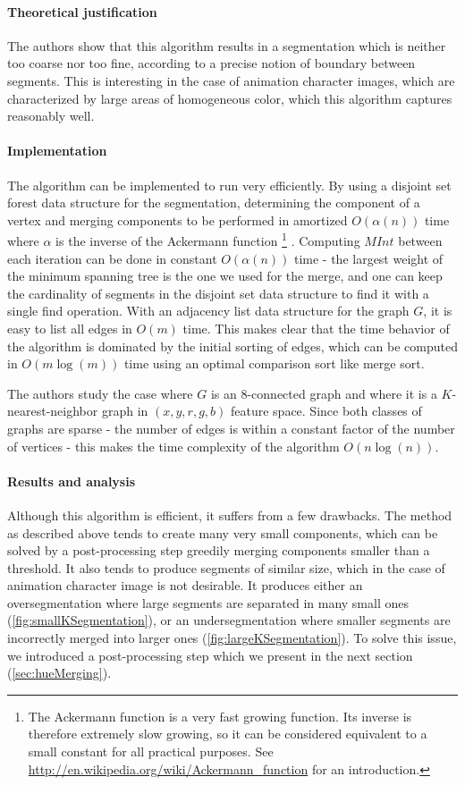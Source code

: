 \paragraph{Theoretical justification} The authors show that this algorithm results in a segmentation which is neither too coarse nor too fine, according to a precise notion of boundary between segments. This is interesting in the case of animation character images, which are characterized by large areas of homogeneous color, which this algorithm captures reasonably well.

\paragraph{Implementation} The algorithm can be implemented to run very efficiently. By using a disjoint set forest data structure for the segmentation, determining the component of a vertex and merging components to be performed in amortized $O(\alpha(n))$ time where $\alpha$ is the inverse of the Ackermann function
\footnote{
The Ackermann function is a very fast growing function. Its inverse is therefore extremely slow growing, so it can be considered equivalent to a small constant for all practical purposes. See \url{http://en.wikipedia.org/wiki/Ackermann_function} for an introduction.
} \cite{tarjan1975efficiency}. Computing $MInt$ between each iteration can be done in constant $O(\alpha(n))$ time - the largest weight of the minimum spanning tree is the one we used for the merge, and one can keep the cardinality of segments in the disjoint set data structure to find it with a single find operation. With an adjacency list data structure for the graph $G$, it is easy to list all edges in $O(m)$ time. This makes clear that the time behavior of the algorithm is dominated by the initial sorting of edges, which can be computed in $O(m\log(m))$ time using an optimal comparison sort like merge sort.

The authors study the case where $G$ is an $8$-connected graph and where it is a $K$-nearest-neighbor graph in $(x, y, r, g, b)$ feature space. Since both classes of graphs are sparse - the number of edges is within a constant factor of the number of vertices - this makes the time complexity of the algorithm $O(n\log(n))$.

\paragraph{Results and analysis} Although this algorithm is efficient, it suffers from a few drawbacks. The method as described above tends to create many very small components, which can be solved by a post-processing step greedily merging components smaller than a threshold. It also tends to produce segments of similar size, which in the case of animation character image is not desirable. It produces either an oversegmentation where large segments are separated in many small ones (\autoref{fig:smallKSegmentation}), or an undersegmentation where smaller segments are incorrectly merged into larger ones (\autoref{fig:largeKSegmentation}). To solve this issue, we introduced a post-processing step which we present in the next section (\autoref{sec:hueMerging}).

